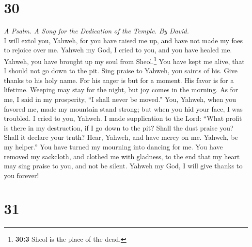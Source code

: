 \hypertarget{section-29}{%
\section{30}\label{section-29}}

\emph{A Psalm. A Song for the Dedication of the Temple. By David.}\\
 I will extol you, Yahweh, for you have raised me up, and
have not made my foes to rejoice over me.  Yahweh my God,
I cried to you, and you have healed me.  Yahweh, you have
brought up my soul from Sheol.\footnote{\textbf{30:3} Sheol is the place
  of the dead.} You have kept me alive, that I should not go down to the
pit.  Sing praise to Yahweh, you saints of his. Give
thanks to his holy name.  For his anger is but for a
moment. His favor is for a lifetime. Weeping may stay for the night, but
joy comes in the morning.  As for me, I said in my
prosperity, ``I shall never be moved.''  You, Yahweh, when
you favored me, made my mountain stand strong; but when you hid your
face, I was troubled.  I cried to you, Yahweh. I made
supplication to the Lord:  ``What profit is there in my
destruction, if I go down to the pit? Shall the dust praise you? Shall
it declare your truth?  Hear, Yahweh, and have mercy on
me. Yahweh, be my helper.''  You have turned my mourning
into dancing for me. You have removed my sackcloth, and clothed me with
gladness,  to the end that my heart may sing praise to
you, and not be silent. Yahweh my God, I will give thanks to you
forever!

\hypertarget{section-30}{%
\section{31}\label{section-30}}

